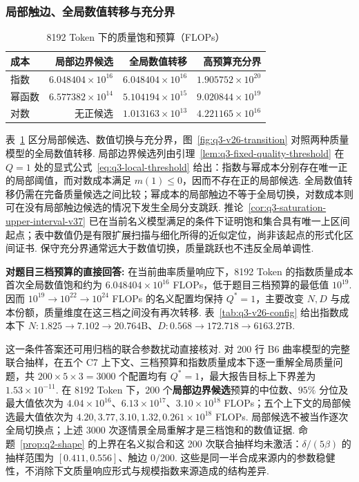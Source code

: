 \subsubsection{局部触边、全局数值转移与充分界}
\begin{table}[htbp]\centering\small
    \caption{8192 Token 下的质量饱和预算（FLOPs）}\label{tab:q3-transition-v8}
    \begin{tabular}{lrrr}\toprule
        成本  & 局部边界候选                  & 全局数值转移                  & 高预算充分界                  \\\midrule
        指数  & $6.048404\times10^{16}$ & $6.048404\times10^{16}$ & $1.905752\times10^{20}$ \\
        幂函数 & $6.577382\times10^{14}$ & $5.104194\times10^{15}$ & $9.020844\times10^{19}$ \\
        对数  & 无正候选                    & $1.013163\times10^{13}$ & $4.221165\times10^{16}$ \\\bottomrule
    \end{tabular}\end{table}
表~\ref{tab:q3-transition-v8} 区分局部候选、数值切换与充分界，图~\ref{fig:q3-v26-transition} 对照两种质量模型的全局数值转移. 局部边界候选列由引理~\ref{lem:q3-fixed-quality-threshold} 在 $Q=1$ 处的显式公式~\eqref{eq:q3-local-threshold} 给出：指数与幂成本分别存在唯一正的局部阈值，而对数成本满足 $m(1)\le0$，因而不存在正的局部候选. 全局数值转移仍需在完备质量候选之间比较；幂成本的局部触边不等于全局切换，对数成本则可在没有局部触边候选的情况下发生全局分支跳跃. 推论~\ref{cor:q3-saturation-upper-interval-v37} 已在当前名义模型满足的条件下证明饱和集合具有唯一上区间起点；表中数值仍是有限扩展扫描与细化所得的近似定位，尚非该起点的形式化区间证书. 保守充分界通常远大于数值切换，质量跳跃也不违反全局单调性. 

\textbf{对题目三档预算的直接回答:}
在当前曲率质量响应下，8192 Token 的指数质量成本首次全局数值饱和约为 $6.048404\times10^{16}$ FLOPs，低于题目三档预算的最低值 $10^{19}$. 因而 $10^{19}\to10^{22}\to10^{24}$ FLOPs 的名义配置均保持 $Q^*=1$，主要改变 $N,D$ 与成本份额，质量维度在这三档之间没有再次转移. 表~\ref{tab:q3-v26-config} 给出指数成本下 $N:1.825\to7.102\to20.764$B、$D:0.568\to172.718\to6163.27$B. 

这一条件答案还可用归档的联合参数扰动直接核对. 对 200 行 B6 曲率模型的完整联合抽样，在五个 C7 上下文、三档预算和指数质量成本下逐一重解全局质量问题，共 $200\times5\times3=3000$ 个配置均有 $Q^*=1$，最大报告目标上下界差为 $1.53\times10^{-11}$. 在 8192 Token 下，200 个\textbf{局部边界候选}预算的中位数、$95\%$ 分位及最大值依次为 $4.04\times10^{16}$、$6.13\times10^{17}$、$3.10\times10^{18}$ FLOPs；五个上下文的局部候选最大值依次为 $4.20,3.77,3.10,1.32,0.261\times10^{18}$ FLOPs. 局部候选不被当作逐次全局切换点；上述 3000 次逐情景全局重解才是三档饱和的数值证据. 命题~\ref{prop:q2-shape} 的上界在名义拟合和这 200 次联合抽样均未激活：$\delta/(5\beta)$ 的抽样范围为 $[0.411,0.556]$、触边 $0/200$. 这些是同一半合成来源内的参数稳健性，不消除下文质量响应形式与规模指数来源造成的结构差异. %

